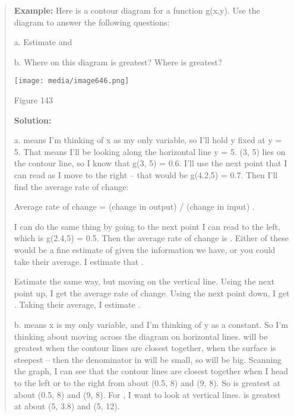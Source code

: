 \begin{quote}
\textbf{Example:} Here is a contour diagram for a function g(x,y). Use
the diagram to answer the following questions:

a. Estimate and

b. Where on this diagram is greatest? Where is greatest?

\texttt{[image: media/image646.png]}

Figure 143

\textbf{Solution:}

a. means I'm thinking of x as my only variable, so I'll hold y fixed at
y = 5. That means I'll be looking along the horizontal line y = 5. (3,
5) lies on the contour line, so I know that g(3, 5) = 0.6. I'll use the
next point that I can read as I move to the right -- that would be
g(4.2,5) = 0.7. Then I'll find the average rate of change:

Average rate of change = (change in output) / (change in input) .

I can do the same thing by going to the next point I can read to the
left, which is g(2.4,5) = 0.5. Then the average rate of change is .
Either of these would be a fine estimate of given the information we
have, or you could take their average. I estimate that .

Estimate the same way, but moving on the vertical line. Using the next
point up, I get the average rate of change. Using the next point down, I
get . Taking their average, I estimate .

b. means x is my only variable, and I'm thinking of y as a constant. So
I'm thinking about moving across the diagram on horizontal lines. will
be greatest when the contour lines are closest together, when the
surface is steepest -- then the denominator in will be small, so will be
big. Scanning the graph, I can see that the contour lines are closest
together when I head to the left or to the right from about (0.5, 8) and
(9, 8). So is greatest at about (0.5, 8) and (9, 8). For , I want to
look at vertical lines. is greatest at about (5, 3.8) and (5, 12).
\end{quote}

\textbf{\\
}

